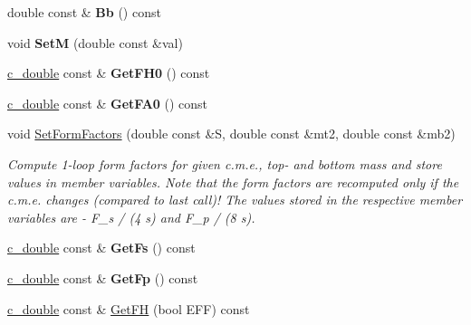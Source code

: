 \begin{DoxyCompactItemize}
\item 
\hypertarget{classHiggsBoson_ad4dc9de0ef7ca8a9c2edb8884e41bd88}{double const \& {\bfseries Bb} () const }\label{classHiggsBoson_ad4dc9de0ef7ca8a9c2edb8884e41bd88}

\item 
\hypertarget{classHiggsBoson_a9b4cda666fb19288713b334bb72e3b40}{void {\bfseries Set\-M} (double const \&val)}\label{classHiggsBoson_a9b4cda666fb19288713b334bb72e3b40}

\item 
\hypertarget{classHiggsBoson_a89f471e351c72fcf5e95846b34727383}{\hyperlink{Global_8h_af390c6bd8192faf6a1e2d875a1d10ca0}{c\-\_\-double} const \& {\bfseries Get\-F\-H0} () const }\label{classHiggsBoson_a89f471e351c72fcf5e95846b34727383}

\item 
\hypertarget{classHiggsBoson_a2be84efb1f350882309f74db3dcc32a5}{\hyperlink{Global_8h_af390c6bd8192faf6a1e2d875a1d10ca0}{c\-\_\-double} const \& {\bfseries Get\-F\-A0} () const }\label{classHiggsBoson_a2be84efb1f350882309f74db3dcc32a5}

\item 
void \hyperlink{classHiggsBoson_a4edd830907f5f06ac24deed99e64da0c}{Set\-Form\-Factors} (double const \&S, double const \&mt2, double const \&mb2)
\begin{DoxyCompactList}\small\item\em Compute 1-\/loop form factors for given c.\-m.\-e., top-\/ and bottom mass and store values in member variables. Note that the form factors are recomputed only if the c.\-m.\-e. changes (compared to last call)! The values stored in the respective member variables are -\/ F\-\_\-s / (4 s) and F\-\_\-p / (8 s). \end{DoxyCompactList}\item 
\hypertarget{classHiggsBoson_a6e3be51e54f71ad1681485d463ba54f9}{\hyperlink{Global_8h_af390c6bd8192faf6a1e2d875a1d10ca0}{c\-\_\-double} const \& {\bfseries Get\-Fs} () const }\label{classHiggsBoson_a6e3be51e54f71ad1681485d463ba54f9}

\item 
\hypertarget{classHiggsBoson_a404990102de3ee3cd1f65a53f0759d76}{\hyperlink{Global_8h_af390c6bd8192faf6a1e2d875a1d10ca0}{c\-\_\-double} const \& {\bfseries Get\-Fp} () const }\label{classHiggsBoson_a404990102de3ee3cd1f65a53f0759d76}

\item 
\hypertarget{classHiggsBoson_af9055e140206943efe94b55ea76c1632}{\hyperlink{Global_8h_af390c6bd8192faf6a1e2d875a1d10ca0}{c\-\_\-double} const \& \hyperlink{classHiggsBoson_af9055e140206943efe94b55ea76c1632}{Get\-F\-H} (bool E\-F\-F) const }\label{classHiggsBoson_af9055e140206943efe94b55ea76c1632}


\end{DoxyCompactItemize}
